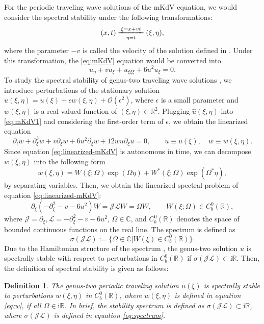 \documentclass[11pt,reqno]{amsart}
\newcommand{\ii}{\mathrm{i}}
\newtheorem{define}{Definition}
\numberwithin{equation}{section}
\begin{document}
For the periodic traveling wave solutions  of the mKdV equation, we would consider the spectral stability under the following transformations:
\begin{equation}\label{eq:transformation-xi-eta}
	(x,t) \xlongequal[\eta=t]{\xi=x+vt} (\xi,\eta),
\end{equation}
where the parameter $-v$ is called the velocity of the solution defined in .
Under this transformation, the \ref{eq:mKdV} equation would be converted into
\begin{equation}\label{eq:mKdV1}
	u_{\eta}+vu_{\xi}+u_{\xi\xi\xi}+6u^2u_{\xi}=0.
\end{equation}
To study the spectral stability of genus-two traveling wave solutions , we introduce perturbations of the stationary solution $\hat{u}(\xi,\eta)=u(\xi)+\epsilon w(\xi,\eta)+\mathcal{O}(\epsilon^2)$,
where $\epsilon$ is a small parameter and $w(\xi,\eta)$ is a real-valued function of $(\xi,\eta)\in \mathbb{R}^2$. 
Plugging $\hat{u}(\xi,\eta)$ into \eqref{eq:mKdV1} and considering the first-order term of $\epsilon$, we obtain the linearized equation
\begin{equation}\label{eq:linearized-mKdV}
	\partial_t w +\partial_{\xi}^3w +v\partial_{\xi}w +6u^2\partial_{\xi}w +12w u\partial_{\xi}u=0, \qquad u\equiv u(\xi), \quad w\equiv w(\xi,\eta).
\end{equation}
Since equation \eqref{eq:linearized-mKdV} is autonomous in time, we can decompose $w(\xi,\eta)$ into the following form
\begin{equation}\label{eq:w}
	w(\xi,\eta)=W(\xi;\Omega)\exp(\Omega \eta)+W^*(\xi;\Omega)\exp(\Omega^* \eta),
\end{equation}
by separating variables.
Then, we obtain the linearized spectral problem of equation \eqref{eq:linearized-mKdV}:
\begin{equation}\label{eq:spectral}
	\partial_\xi  (-\partial_\xi^2-v-6u^2)W=\mathcal{JL}W=\Omega W, \qquad W(\xi;\Omega) \in C_b^0(\mathbb{R}),
\end{equation} 
where $\mathcal{J}=\partial_\xi,\mathcal{L}=-\partial_\xi^2-v-6u^2$, $\Omega\in \mathbb{C}$, and $C_b^0(\mathbb{R})$ denotes the space of bounded continuous functions on the real line. 
The spectrum is defined as 
\begin{equation}\label{eq:spectrum}
	\sigma(\mathcal{JL}):=\{\Omega\in \mathbb{C}| W(\xi)\in C^0_b(\mathbb{R})\}. 
\end{equation}
Due to the Hamiltonian structure of the spectrum \cite{HaragusK-08}, the genus-two solution $u$ is spectrally stable with respect to perturbations in $C_b^0(\mathbb{R})$ if $\sigma(\mathcal{JL})\subset \ii \mathbb{R}$. 
Then, the definition of spectral stability is given as follows: 
\begin{define}\label{define:spect-stable}
	The genus-two periodic traveling solution $u(\xi)$ is spectrally stable to perturbations $w(\xi,\eta)$ in $C_b^0(\mathbb{R})$, where $w(\xi,\eta)$ is defined in equation \eqref{eq:w}, if all $\Omega\in \ii \mathbb{R}$. In brief, the stability spectrum is defined as $\sigma(\mathcal{JL})\subset \ii \mathbb{R}$, where $\sigma(\mathcal{JL})$ is defined in equation \eqref{eq:spectrum}.
\end{define}
\end{document}
